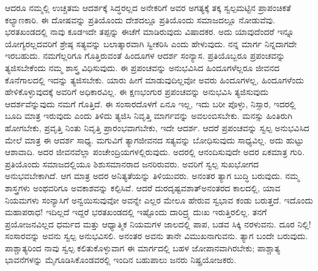ಆದರೂ ನಮ್ಮಲ್ಲಿ ಉಚ್ಚತಮ ಆದರ್ಶಕ್ಕೆ ಸಿದ್ಧರಲ್ಲದ ಅನೇಕರಿಗೆ ಅವರ ಅಗತ್ಯಕ್ಕೆ ತಕ್ಕ ಸ್ವಲ್ಪಮಟ್ಟಿನ ಪ್ರಾಪಂಚಿಕತೆ ಕಲ್ಯಾಣಕಾರಿ. ಈ ದೋಷವನ್ನು ಪ್ರತಿಯೊಂದು ದೇಶದಲ್ಲೂ ಪ್ರತಿಯೊಂದು ಸಮಾಜದಲ್ಲೂ ನೋಡುವೆವು. ಭರತಖಂಡದಲ್ಲಿ ನಾವು ಕೂಡ\break ಇದೇ ತಪ್ಪನ್ನು ಈಚೆಗೆ ಮಾಡಿರುವುದು ವಿಷಾದಕರ. ಅದು ಯಾವುದೆಂದರೆ ಇನ್ನೂ ಯೋಗ್ಯರಲ್ಲದವರಿಗೆ ಶ್ರೇಷ್ಠ ಸತ್ಯವನ್ನು ಬಲಾತ್ಕಾರವಾಗಿ ಸ್ವೀಕರಿಸಿ ಎಂದು ಹೇಳುವುದು. ನನ್ನ ಮಾರ್ಗ ನಿನ್ನದಾಗದೇ ಇರಬಹುದು. ನಮಗೆಲ್ಲರಿಗೂ ಗೊತ್ತಿರುವಂತೆ ಹಿಂದೂಗಳ ಆದರ್ಶ ಸಂನ್ಯಾಸ. ಪ್ರತಿಯೊಬ್ಬರೂ ಪ್ರಪಂಚವನ್ನು ತ್ಯಜಿಸಬೇಕೆಂದು ನಮ್ಮ ಶಾಸ್ತ್ರ ವಿಧಿಸುವುದು. ಈ ಪ್ರಪಂಚವನ್ನು ಅನುಭವಿಸಿದ ಹಿಂದೂಗಳೆಲ್ಲರೂ ಜೀವನದ ಕೊನೆಗಾಲದಲ್ಲಿ ಇದನ್ನು ತ್ಯಜಿಸಬೇಕು. ಯಾರು ಹೀಗೆ ಮಾಡುವುದಿಲ್ಲವೋ ಅವರು ಹಿಂದೂಗಳಲ್ಲ, ಹಿಂದೂಗಳೆಂದು ಹೇಳಿಕೊಳ್ಳುವುದಕ್ಕೆ ಅವರಿಗೆ ಅಧಿಕಾರವಿಲ್ಲ. ಈ ಕ್ಷಣಭಂಗುರ ಪ್ರಪಂಚವನ್ನು ಅನುಭವಿಸಿ ತ್ಯಜಿಸುವುದು ಆದರ್ಶವೆನ್ನುವುದು ನಮಗೆ ಗೊತ್ತಿದೆ. ಈ ಸಂಸಾರದೊಳಗೆ ಏನೂ ಇಲ್ಲ, ಇದು ಬರೀ ಪೊಳ್ಳು, ನಿಸ್ಸಾರ, ಇದರಲ್ಲಿ ಬೂದಿ ಮಾತ್ರ ಇರುವುದು ಎಂದು ತಿಳಿದು ತ್ಯಜಿಸಿ ನಿವೃತ್ತಿ ಮಾರ್ಗವನ್ನು ಅವಲಂಬಿಸಬೇಕು. ಮನಸ್ಸು ಹಿಂತಿರುಗಿ ಹೋಗಬೇಕು, ಪ್ರವೃತ್ತಿ ನಿಂತು ನಿವೃತ್ತಿ ಪ್ರಾರಂಭವಾಗಬೇಕು, ಇದೇ ಆದರ್ಶ. ಆದರೆ ಪ್ರಪಂಚವನ್ನು ಸ್ವಲ್ಪ ಅನುಭವಿಸಿದ ಮೇಲೆ ಮಾತ್ರ ಈ ಆದರ್ಶ ಸಾಧ್ಯ. ಮಗುವಿಗೆ ತ್ಯಾಗಜೀವನದ ಸತ್ಯವನ್ನು ಬೋಧಿಸುವುದು ಸಾಧ್ಯವಿಲ್ಲ. ಅದು ಹುಟ್ಟು ಆಶಾವಾದಿ. ಅದರ ಜೀವನವೆಲ್ಲಾ ಪಂಚೇಂದ್ರಿಯಗಳಲ್ಲಿರುವುದು. ಅದರಲ್ಲಿ ಆನಂದಿಸುವುದೇ ಅದರ ಏಕಮಾತ್ರ ಗುರಿ. ಪ್ರತಿಯೊಂದು ಸಮಾಜದಲ್ಲಿಯೂ ಶಿಶುಸಮಾನರಾದ ಜನರಿರುವರು. ಅವರಿಗೆ ಸ್ವಲ್ಪ ಸುಖಭೋಗದ ಅನುಭವಬೇಕಾಗಿದೆ. ಆಗ ಮಾತ್ರ ಅದರ ಅನಿತ್ಯತೆಯನ್ನು ತಿಳಿಯುವರು. ಅನಂತರ ತ್ಯಾಗ ಬುದ್ಧಿ ಬರುವುದು. ನಮ್ಮ ಶಾಸ್ತ್ರಗಳು ಅಂಥವರಿಗೂ ಅವಕಾಶವನ್ನು ಕಲ್ಪಿಸಿವೆ. ಆದರೆ ದುರದೃಷ್ಟವಶಾತ್​ ಅನಂತರದ ಕಾಲದಲ್ಲಿ, ಯಾವ ನಿಯಮಗಳು ಸಂನ್ಯಾಸಿಗೆ ಅನ್ವಯಿಸುವುವೋ ಅವನ್ನೇ ಎಲ್ಲರ ಮೇಲೂ ಹೇರುವ ಸ್ವಭಾವ ಕಂಡು ಬರುತ್ತದೆ. ಇದೊಂದು ಮಹಾಪರಾಧ! ಇದಿಲ್ಲದೆ ಇದ್ದರೆ ಭರತಖಂಡದಲ್ಲಿ ಇಷ್ಟೊಂದು ದಾರಿದ್ರ್ಯ ದುಃಖ ಇರುತ್ತಿರಲಿಲ್ಲ. ತನಗೆ ಪ್ರಯೋಜನವಿಲ್ಲದ ಧರ್ಮದ ಮತ್ತು ಆಧ್ಯಾತ್ಮಿಕ ನಿಯಮಗಳ ಜಾಲದಲ್ಲಿ ಪಾಪ, ಬಡವ ಸಿಕ್ಕಿ ನರಳುವನು. ದೂರ ನಿಲ್ಲಿ! ಸಂಸಾರವನ್ನು ಅವನು ಸ್ವಲ್ಪ ಅನುಭವಿಸಲಿ. ಅನಂತರ ಅವನು ತಾನೇ ವಿಮುಖನಾಗುವನು. ತ್ಯಾಗ ಬಂದೇ ಬರುವುದು. ಪಾಶ್ಚಾತ್ಯರಿಂದ ನಾವು ಸ್ವಲ್ಪ ಕಲಿತುಕೊಳ್ಳುವಾಗ ಈ ಮಾರ್ಗದಲ್ಲಿ ಬಹಳ ಜೋಪಾನವಾಗಿರಬೇಕು; ಪಾಶ್ಚಾತ್ಯ ಭಾವನೆಗಳನ್ನು ಮೈಗೂಡಿಸಿಕೊಂಡವರಲ್ಲಿ ಇಂದಿನ ಬಹುಪಾಲು ಜನರು ನಿಷ್ಪ್ರಯೋಜಕರು.

